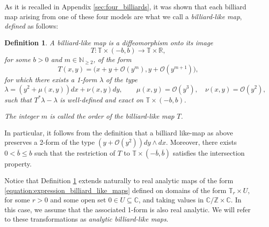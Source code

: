 \documentclass[10pt]{article}
\newtheorem{definition}[theorem]{Definition}
\newcommand{\Z}{\mathbb{Z}}
\newcommand{\N}{\mathbb{N}}
\newcommand{\R}{\mathbb{R}}
\newcommand{\C}{\mathbb{C}}
\newcommand{\T}{\mathbb{T}}
\newcommand{\Function}[5]{\begin{array}{cccc} #1 : & #2 & \rightarrow & #3 \\ & #4 & \mapsto & #5 \end{array}}
\newcommand{\bigo}[1]{\mathcal{O}\left(#1\right)}
\begin{document}
As it is recalled in Appendix \ref{sec:four_billiards}, it was shown that each billiard map arising from one of these four models are what we call a \textit{billiard-like map}, \textit{defined} as follows:

\begin{definition}
\label{def:billiard-like}
A \emph{billiard-like map} is a diffeomorphism onto its image $$T: \T \times (-b, b) \to \T \times \R,$$
for some $b > 0$ and $m \in \N_{\geq 2}$, of the form
\begin{equation}
 \label{equation:expression_billiard_like_maps}
T(x, y) = \big(x+y+\bigo{y^m},y+\bigo{y^{m+1}}\big),
\end{equation}
 for which there exists a 1-form $\lambda$ of the type
\begin{equation}
    \label{equation:expression_one_form}
\lambda = (y^2 + \mu(x, y))dx + \nu(x, y)dy, \qquad \mu(x, y) = \bigo{y^3}, \quad \nu(x, y)= \bigo{y^2},
\end{equation}
such that $T^*\lambda - \lambda $ is well-defined and exact on $\T \times (-b, b)$. 

The integer $m$ is called the \emph{order} of the billiard-like map $T$.
\end{definition}

In particular, it follows from the definition that a billiard like-map as above preserves a 2-form of the type $(y + \bigo{y^2})dy \wedge dx$. Moreover, there exists $0  <\overline{b} \leq b$ such that the restriction of $T$ to $\T \times (-\overline{b}, \overline{b})$ satisfies the intersection property.


Notice that Definition \ref{def:billiard-like} extends naturally to real analytic maps of the form \eqref{equation:expression_billiard_like_maps} defined on domains of the form $\T_r \times U$, for some $r > 0$ and some open set $0 \in U \subseteq \C$, and taking values in $\C/\Z \times \C$. In this case, we assume that the associated 1-form is also real analytic. We will refer to these transformations as \emph{analytic billiard-like maps}.
\end{document}
